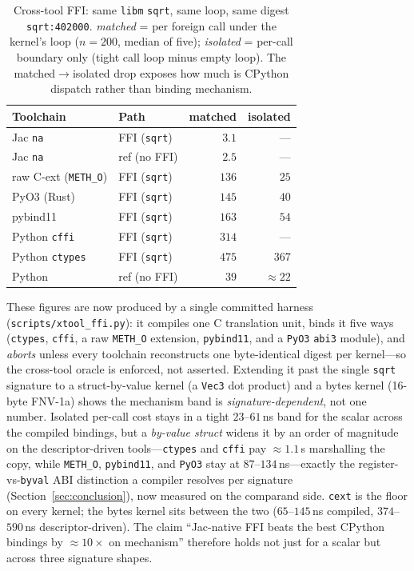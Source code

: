 \documentclass[conference]{IEEEtran}
\newcommand{\code}[1]{\texttt{#1}}
\begin{document}
\begin{table}[t]
\caption{Cross-tool FFI: same \code{libm} \code{sqrt}, same loop, same digest
\code{sqrt:402000}. \emph{matched} = per foreign call under the kernel's loop
($n{=}200$, median of five); \emph{isolated} = per-call boundary only (tight call
loop minus empty loop). The matched$\to$isolated drop exposes how much is
CPython dispatch rather than binding mechanism.}
\label{tab:xtool}
\centering
\small
\begin{tabular}{@{}llrr@{}}
\toprule
Toolchain & Path & matched & isolated \\
\midrule
Jac \code{na}        & FFI (\code{sqrt})  & $3.1$ & --- \\
Jac \code{na}        & ref (no FFI)       & $2.5$ & --- \\
raw C-ext (\code{METH\_O}) & FFI (\code{sqrt}) & $136$ & $25$ \\
PyO3 (Rust)          & FFI (\code{sqrt})  & $145$ & $40$ \\
pybind11             & FFI (\code{sqrt})  & $163$ & $54$ \\
Python \code{cffi}   & FFI (\code{sqrt})  & $314$ & --- \\
Python \code{ctypes} & FFI (\code{sqrt})  & $475$ & $367$ \\
Python               & ref (no FFI)       & $39$  & $\approx$$22$ \\
\bottomrule
\end{tabular}
\end{table}

These figures are now produced by a single committed
harness (\code{scripts/xtool\_ffi.py}): it compiles one C translation unit,
binds it five ways (\code{ctypes}, \code{cffi}, a raw \code{METH\_O} extension,
\code{pybind11}, and a \code{PyO3} \code{abi3} module), and \emph{aborts} unless
every toolchain reconstructs one byte-identical digest per kernel---so the
cross-tool oracle is enforced, not asserted. Extending it past the single
\code{sqrt} signature to a struct-by-value kernel (a \code{Vec3} dot product) and
a bytes kernel (16-byte FNV-1a) shows the mechanism band is
\emph{signature-dependent}, not one number. Isolated per-call cost stays in a
tight $23$--$61$\,ns band for the scalar across the compiled bindings, but a
\emph{by-value struct} widens it by an order of magnitude on the descriptor-driven
tools---\code{ctypes} and \code{cffi} pay $\approx$$1.1$\,\textmu s marshalling
the copy, while \code{METH\_O}, \code{pybind11}, and \code{PyO3} stay at
$87$--$134$\,ns---exactly the register-vs-\code{byval} ABI distinction a compiler
resolves per signature (Section~\ref{sec:conclusion}), now measured on the
comparand side. \code{cext} is the floor on every kernel; the bytes kernel sits
between the two ($65$--$145$\,ns compiled, $374$--$590$\,ns descriptor-driven).
The claim ``Jac-native FFI beats the best CPython bindings by
$\approx$$10\times$ on mechanism'' therefore holds not just for a scalar but
across three signature shapes.
\end{document}
